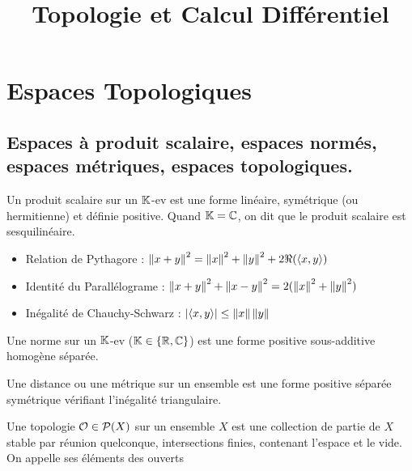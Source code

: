 \documentclass{cours}
\title{Topologie et Calcul Différentiel}
\begin{document}
\newpage
\section{Espaces Topologiques}

\subsection{Espaces à produit scalaire, espaces normés, espaces métriques, espaces topologiques.}

\begin{definition}
    Un produit scalaire sur un $\mathbb{K}$-ev est une forme linéaire, symétrique (ou hermitienne) et définie positive.
    Quand $\mathbb{K} = \mathbb{C}$, on dit que le produit scalaire est sesquilinéaire.
\end{definition}

\begin{proposition}
    \begin{itemize}
        \item Relation de Pythagore : $\left\lVert x + y\right\rVert^{2} = \left\lVert x\right\rVert^{2} + \left\lVert y\right\rVert^{2} + 2\Re(\langle x, y \rangle)$
        \item Identité du Parallélograme : $\left\lVert x + y\right\rVert^{2} + \left\lVert x - y\right\rVert^{2} = 2(\left\lVert x\right\rVert^{2} + \left\lVert y\right\rVert^{2})$
        \item Inégalité de Chauchy-Schwarz : $\left|\langle x, y \rangle\right| \leq \left\lVert x\right\rVert\left\lVert y\right\rVert$
    \end{itemize}
\end{proposition}

\begin{definition}
    Une norme sur un $\mathbb{K}$-ev ($\mathbb{K} \in\left\{\mathbb{R}, \mathbb{C}\right\}$) est une forme positive sous-additive homogène séparée.
\end{definition}

\begin{definition}
    Une distance ou une métrique sur un ensemble est une forme positive séparée symétrique vérifiant l'inégalité triangulaire.
\end{definition}

\begin{definition}
    Une topologie $\mathcal{O} \in \mathcal{P}(X)$ sur un ensemble $X$ est une collection de partie de $X$ stable par réunion quelconque, intersections finies, contenant l'espace et le vide. On appelle ses éléments des ouverts
\end{definition}
\end{document}
